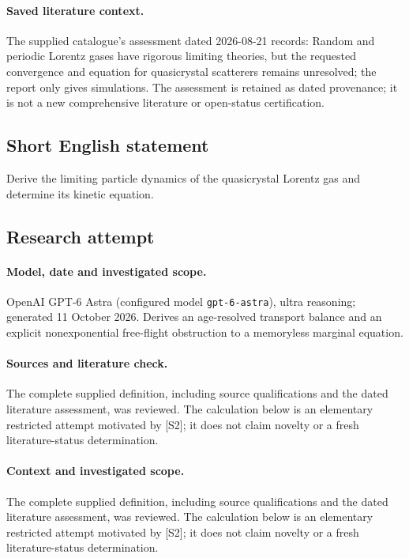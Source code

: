 \documentclass[11pt]{article}
\begin{document}
\paragraph{Saved literature context.} The supplied catalogue's assessment dated 2026-08-21 records: Random and periodic Lorentz gases have rigorous limiting theories, but the requested convergence and equation for quasicrystal scatterers remains unresolved; the report only gives simulations. The assessment is retained as dated provenance; it is not a new comprehensive literature or open-status certification.
\subsection{Short English statement}
Derive the limiting particle dynamics of the quasicrystal Lorentz gas and determine its kinetic equation.
\subsection{Research attempt}
\paragraph{Model, date and investigated scope.}
OpenAI GPT-6 Astra (configured model \texttt{gpt-6-astra}), ultra reasoning; generated 11 October 2026. Derives an age-resolved transport balance and an explicit nonexponential free-flight obstruction to a memoryless marginal equation.

\paragraph{Sources and literature check.}
The complete supplied definition, including source qualifications and the dated literature assessment, was reviewed. The calculation below is an elementary restricted attempt motivated by [S2]; it does not claim novelty or a fresh literature-status determination.

\paragraph{Context and investigated scope.} The complete supplied definition, including source qualifications and the dated literature assessment, was reviewed. The calculation below is an elementary restricted attempt motivated by [S2]; it does not claim novelty or a fresh literature-status determination.
\end{document}
